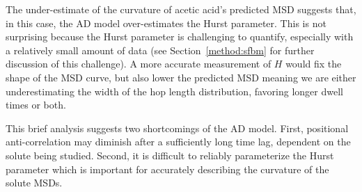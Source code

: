 \documentclass{article}
\begin{document}
  The under-estimate of the curvature of acetic acid's predicted MSD suggests that,
  in this case, the AD model over-estimates the Hurst parameter. This is not surprising
  because the Hurst parameter is challenging to quantify, especially with a relatively 
  small amount of data (see Section~\ref{method:sfbm} for further discussion of this 
  challenge). A more accurate measurement of $H$ would fix the shape of the MSD curve,
  but also lower the predicted MSD meaning we are either underestimating the width of
  the hop length distribution, favoring longer dwell times or both.
  
  
  
  
  This brief analysis suggests two shortcomings of the AD model. First, positional
  anti-correlation may diminish after a sufficiently long time lag, dependent on the 
  solute being studied. Second, it is difficult to reliably parameterize the Hurst
  parameter which is important for accurately describing the curvature of the solute
  MSDs.
  
\end{document}
